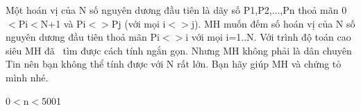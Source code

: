 Một hoán vị của N số nguyên dương đầu tiên là dãy số P1,P2,...,Pn thoả mãn 0$<$Pi$<$N+1 và Pi$<$$>$Pj (với mọi i$<$$>$j). MH muốn đếm số hoán vị của N số nguyên dương đầu tiên thoả mãn Pi$<$$>$i với mọi i=1..N. Với trình độ toán cao siêu MH đã  tìm được cách tính ngắn gọn. Nhưng MH không phải là dân chuyên Tin nên bạn không thể tính được với N rất lớn. Bạn hãy giúp MH và chứng tỏ mình nhé.  

0$<$n$<$5001